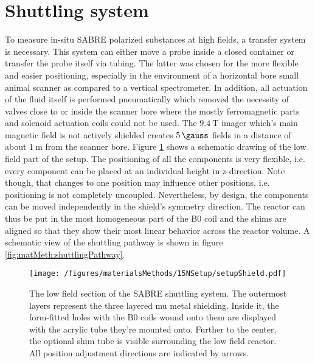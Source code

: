     \section{Shuttling system}
    \label{sec:shuttlingSystem}
    To measure in-situ SABRE polarized substances at high fields, a transfer system is necessary. This system can either move a probe inside a closed container \cite{kiryutin_fast_2016-1} or transfer the probe itself via tubing. The latter was chosen for the more flexible and easier positioning, especially in the environment of a horizontal bore small animal scanner as compared to a vertical spectrometer. In addition, all actuation of the fluid itself is performed pneumatically which removed the necessity of valves close to or inside the scanner bore where the mostly ferromagnetic parts and solenoid actuation coils could not be used.
    The $\SI{9.4}{\tesla}$ imager which's main magnetic field is not actively shielded creates $\SI{5}{\gauss}$ fields in a distance of about $\SI{1}{\meter}$ from the scanner bore.
    Figure \ref{fig:matMeth:shields15N} shows a schematic drawing of the low field part of the setup. The positioning of all the components is very flexible, i.e. every component can be placed at an individual height in z-direction. Note though, that changes to one position may influence other positions, i.e. positioning is not completely uncoupled. Nevertheless, by design, the components can be moved independently in the shield's symmetry direction. The reactor can thus be put in the most homogeneous part of the B0 coil and the shims are aligned so that they show their most linear behavior across the reactor volume. A schematic view of the shuttling pathway is shown in figure \ref{fig:matMeth:shuttlingPathway}.
        \begin{figure}
            \texttt{[image: /figures/materialsMethods/15NSetup/setupShield.pdf]}
            \caption[Shuttling system shields]{The low field section of the SABRE shuttling system. The outermost layers represent the three layered mu metal shielding. Inside it, the form-fitted holes with the B0 coils wound onto them are displayed with the acrylic tube they're mounted onto. Further to the center, the optional shim tube is visible surrounding the low field reactor. All position adjustment directions are indicated by arrows.}
            \label{fig:matMeth:shields15N}
        \end{figure}
